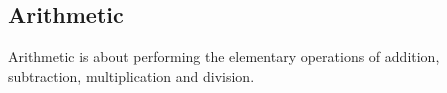 

\subsection{Arithmetic}
Arithmetic is about performing the elementary operations of addition, subtraction, multiplication and division. %



%
%


